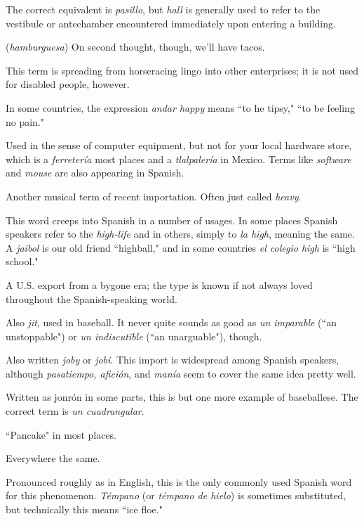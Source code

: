  The correct equivalent is \emph{pasillo}, but \emph{hall} is generally
used to refer to the vestibule or antechamber encountered immediately
upon entering a building.

 (\emph{hamburguesa}) On second thought, though,
we'll have tacos.

 This term is spreading from horseracing lingo
into other enterprises; it is not used for disabled people, however.

 In some countries, the expression \emph{andar happy} means
``to he tipsy," ``to be feeling no pain."

 Used in the sense of computer equipment, but
not for your local hardware store, which is a \emph{ferretería} most places and
a \emph{tlalpalería} in Mexico. Terms like \emph{software} and \emph{mouse} are also appearing in Spanish.

 Another musical term of recent importation.
Often just called \emph{heavy}.

 This word creeps into Spanish in a number of usages.
In some places Spanish speakers refer to the \emph{high-life} and in others,
simply to \emph{la high}, meaning the same. A \emph{jaibol} is our old friend ``highball," and in some countries \emph{el colegio high} is ``high school."

 A U.S. export from a bygone era; the type is known if
not always loved throughout the Spanish-speaking world.

 Also \emph{jit}, used in baseball. It never quite sounds as good as
\emph{un imparable} (``an unstoppable") or \emph{un indiscutible} (``an unarguable"),
though.

 Also written \emph{joby} or \emph{jobi}. This import is widespread
among Spanish speakers, although \emph{pasatiempo, afición}, and \emph{manía}
seem to cover the same idea pretty well.

 Written as jonrón in some parts, this is but one
more example of baseballese. The correct term is \emph{un cuadrangular}.

 ``Pancake" in most places.

 Everywhere the same.

 Pronounced roughly as in English, this is the only
commonly used Spanish word for this phenomenon. \emph{Témpano} (or \emph{témpano de hielo}) is sometimes substituted, but technically this means
``ice floe."

